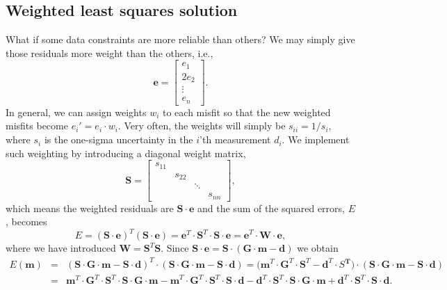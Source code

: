 \subsection{Weighted least squares solution}

	What if some data constraints are more reliable than others? We may simply give those residuals more 
weight than the others, i.e.,
\begin{equation}
\mathbf{e} = \left[ \begin{array}{c} e_1 \\ 2e_2\\ \vdots \\ e_n \end{array} \right ] .
\end{equation}	 
In general, we can assign weights $w_i$ to each misfit so that the new weighted misfits become $e_i' = e_i\cdot w_i$.
Very often, the weights will simply be $s_{ii} = 1/s_i$, where $s_i$ is the one-sigma uncertainty in the $i$'th measurement $d_i$.
We implement such weighting by introducing a diagonal weight matrix,
\begin{equation}
{\mathbf S} = \left[\begin{array}{cccc}
s_{11} \\ & s_{22}\\ & & \ddots\\ & & & s_{nn} \end{array}
  \right ],
\end{equation}
which means the weighted residuals are $\mathbf{S}\cdot\mathbf{e}$ and the sum of the squared errors, $E$, becomes
\begin{equation}
E = \left (\mathbf{S}\cdot\mathbf{e}\right )^T\left (\mathbf{S}\cdot\mathbf{e}\right ) = \mathbf{e}^T \cdot \mathbf{S}^T \cdot \mathbf{S \cdot e = e}^T \cdot \mathbf{W \cdot e},
\end{equation}	 
where we have introduced $\mathbf{W = S}^T\mathbf{S}$. Since $\mathbf{S} \cdot \mathbf{e = S\cdot(G \cdot m - d)}$ we obtain
\begin{equation}
\begin{array}{rcl}
E(\mathbf{m}) & = & \mathbf{(S \cdot G \cdot m - S\cdot d)}^T \cdot \mathbf{(S \cdot G \cdot m - S \cdot d)} =
(\mathbf{m}^T \cdot \mathbf{G}^T \cdot \mathbf{S}^T - \mathbf{d}^T \cdot S\mathbf{^T) \cdot (S \cdot G \cdot m - S \cdot d)}\\
& = & \mathbf{m}^T \cdot \mathbf{G} ^T \cdot \mathbf{S}^T \cdot \mathbf{S \cdot G \cdot  m - m}^T \cdot \mathbf{G}^T \cdot \mathbf{S}^T \cdot \mathbf{S \cdot d - d}^T \cdot \mathbf{S}^T \cdot \mathbf{S \cdot G  \cdot m + d}^T \cdot \mathbf{S}^T \cdot \mathbf{S \cdot d}.
\end{array}
\end{equation}
